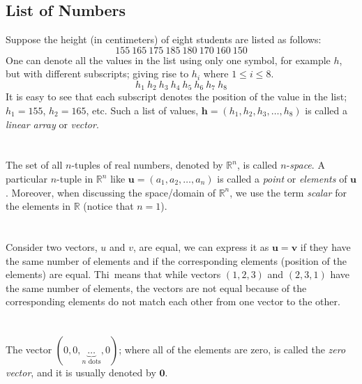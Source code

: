 \documentclass[../setup.tex]{subfiles}
\begin{document}
\subsection{List of Numbers}
Suppose the height (in centimeters) of eight students are listed as follows:
\[155 \ 165 \ 175 \ 185 \ 180 \ 170 \ 160 \ 150\]
One can denote all the values in the list using only one symbol, for example $h$, but with different subscripts; giving rise to $h_i$ where $1 \leq i \leq 8$. 
\[h_1 \ h_2 \ h_3 \ h_4 \ h_5 \ h_6 \ h_7 \ h_8\]
It is easy to see that each subscript denotes the position of the value in the list; $h_1 = 155$, $h_2 = 165$, etc. Such a list of values, $\bm{h} = (h_1, h_2, h_3, \dots, h_8)$ is called a \textit{linear array} or \textit{vector}. \\
\phantom \\ \\
The set of all $n$-tuples of real numbers, denoted by $\mathbb{R}^n$, is called $n$-\textit{space}. A particular $n$-tuple in $\mathbb{R}^n$ like $\bm{u} = (a_1, a_2, \dots, a_n)$ is called a \textit{point} or \textit{elements} of $\bm{u}$. Moreover, when discussing the space/domain of $\mathbb{R}^n$, we use the term \textit{scalar} for the elements in $\mathbb{R}$ (notice that $n = 1$). \\
\phantom \\ \\
Consider two vectors, $u$ and $v$, are equal, we can express it as $\bm{u} = \bm{v}$ if they have the same number of elements and if the corresponding elements (position of the elements) are equal. Thi\ means that while vectors $(1, 2, 3)$ and $(2, 3, 1)$ have the same number of elements, the vectors are not equal because of the corresponding elements do not match each other from one vector to the other. \\
\phantom \\ \\
The vector $(0, 0, \underbrace{\dots}_{n \text{ dots}}, 0)$; where all of the elements are zero, is called the \textit{zero vector}, and it is usually denoted by $\boldsymbol{0}$. 
\end{document}
